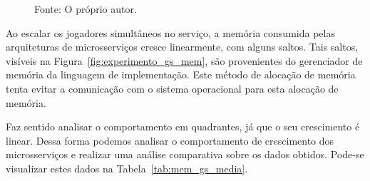 \begin{figure}[htb!]
    Fonte: O próprio autor.
\end{figure}

Ao escalar os jogadores simultâneos no serviço, a memória consumida pelas arquiteturas de microsserviços cresce linearmente, com alguns saltos.
%
Tais saltos, visíveis na Figura~\ref{fig:experimento_gs_mem}, são provenientes do gerenciador de memória da linguagem de implementação.
%
Este método de alocação de memória tenta evitar a comunicação com o sistema operacional para esta alocação de memória.


Faz sentido analisar o comportamento em quadrantes, já que o seu crescimento é linear.
%
Dessa forma podemos analisar o comportamento de crescimento dos microsserviços e realizar uma análise comparativa sobre os dados obtidos.
%
Pode-se visualizar estes dados na Tabela~\ref{tab:mem_gs_media}.

